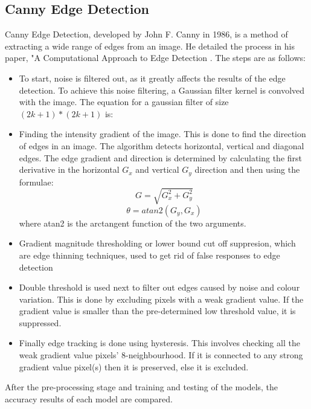\documentclass[conference]{IEEEtran}
\begin{document}
\subsection{Canny Edge Detection}
Canny Edge Detection, developed by John F. Canny in 1986, is a method of extracting a wide range of edges from an image. He detailed the process in his paper, "A Computational Approach to Edge Detection \cite{b1}. The steps are as follows:
\begin{itemize}

\item To start, noise is filtered out, as it greatly affects the results of the edge detection. To achieve this noise filtering, a Gaussian filter kernel is convolved with the image. The equation for a gaussian filter of size $(2k+1)*(2k+1)$ is:
\begin{center}
\end{center}
\item Finding the intensity gradient of the image. This is done to find the direction of edges in an image. The algorithm detects horizontal, vertical and diagonal edges. The edge gradient and direction is determined by calculating the first derivative in the horizontal $G_{x}$ and vertical $G_{y}$ direction and then using the formulae: 
\[G=\sqrt{G_{x} ^{2} + G_{y} ^{2}}\]
\[\theta = atan2(G_{y},G_{x})\]
where atan2 is the arctangent function of the two arguments.

\item Gradient magnitude thresholding or lower bound cut off suppresion, which are edge thinning techniques, used to get rid of false responses to edge detection

\item Double threshold is used next to filter out edges caused by noise and colour variation. This is done by excluding pixels with a weak gradient value. If the gradient value is smaller than the pre-determined low threshold value, it is suppressed.

\item Finally edge tracking is done using hysteresis. This involves checking all the weak gradient value pixels' 8-neighbourhood. If it is connected to any strong gradient value pixel(s) then it is preserved, else it is excluded.
\end{itemize}
After the pre-processing stage and training and testing of the models, the accuracy results of each model are compared.
\end{document}
